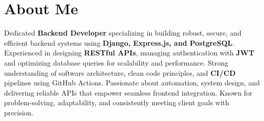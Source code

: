 \section{About Me}

Dedicated \textbf{Backend Developer} specializing in building robust, secure, and efficient backend systems using \textbf{Django, Express.js, and PostgreSQL}. Experienced in designing \textbf{RESTful APIs}, managing authentication with \textbf{JWT} and optimizing database queries for scalability and performance. Strong understanding of software architecture, clean code principles, and \textbf{CI/CD} pipelines using GitHub Actions. Passionate about automation, system design, and delivering reliable APIs that empower seamless frontend integration. Known for problem-solving, adaptability, and consistently meeting client goals with precision.
